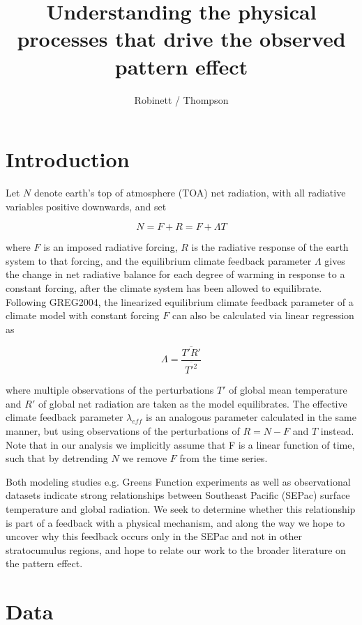\documentclass{article}
\title{Understanding the physical processes that drive the observed pattern effect}
\author{Robinett / Thompson}
\begin{document}
\maketitle

\section{Introduction}

Let $N$ denote earth's top of atmosphere (TOA) net radiation, with all radiative variables positive downwards, and set

\begin{equation}
    N = F + R = F + \Lambda T
\end{equation}

where $F$ is an imposed radiative forcing, $R$ is the radiative response of the earth system to that forcing, and the equilibrium climate feedback parameter $\Lambda$ gives the change in net radiative balance for each degree of warming in response to a constant forcing, after the climate system has been allowed to equilibrate. Following GREG2004, the linearized equilibrium climate feedback parameter of a climate model with constant forcing $F$ can also be calculated via linear regression as

\begin{equation}
    \Lambda = \frac{\overline{T'R'}}{\overline{T'^2}}
\end{equation}

where multiple observations of the perturbations $T'$ of global mean temperature and $R'$ of global net radiation are taken as the model equilibrates. The effective climate feedback parameter $\lambda_{eff}$ is an analogous parameter calculated in the same manner, but using observations of the perturbations of $R = N-F$ and $T$ instead. Note that in our analysis we implicitly assume that F is a linear function of time, such that by detrending $N$ we remove $F$ from the time series.

Both modeling studies e.g. Greens Function experiments as well as observational datasets indicate  strong relationships between Southeast Pacific (SEPac) surface temperature and global radiation. We seek to determine whether this relationship is part of a feedback with a physical mechanism, and along the way we hope to uncover why this feedback occurs only in the SEPac and not in other stratocumulus regions, and hope to relate our work to the broader literature on the pattern effect.

\section{Data}
\end{document}
